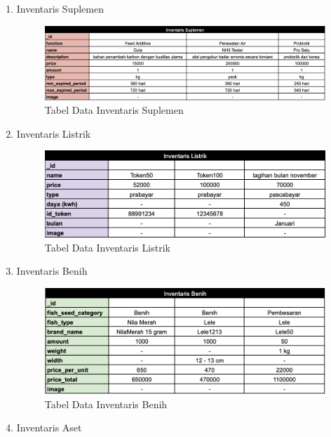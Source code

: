 \begin{spacing}{1.5}
\begin{enumerate}
	\item Inventaris Suplemen
	
	\begin{figure}[H]
		\centering
		\includegraphics[width=1\textwidth]{gambar/tabel_inventaris_suplemen.png}
		\caption{Tabel Data Inventaris Suplemen}
	\end{figure}

	\item Inventaris Listrik
	
	\begin{figure}[H]
		\centering
		\includegraphics[width=1\textwidth]{gambar/tabel_inventaris_listrik.png}
		\caption{Tabel Data Inventaris Listrik}
	\end{figure}	

	\hfill \break

	\item Inventaris Benih
	
	\begin{figure}[H]
		\centering
		\includegraphics[width=1\textwidth]{gambar/tabel_inventaris_benih.png}
		\caption{Tabel Data Inventaris Benih}
	\end{figure}	

	\item Inventaris Aset
	

\end{enumerate}
\end{spacing}
